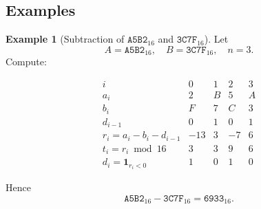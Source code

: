 \documentclass[11pt,a4paper]{article}
\theoremstyle{definition}
\newtheorem{example}{Example}[section]
\theoremstyle{remark}
\begin{document}
\subsection{Examples}
\begin{example}[Subtraction of $\texttt{A5B2}_{16}$ and $\texttt{3C7F}_{16}$]
	Let
	\[
	A = \texttt{A5B2}_{16},\quad B = \texttt{3C7F}_{16},\quad n=3.
	\]
	Compute:
\begin{center}
	\begin{minipage}{.475\textwidth}\centering
	\end{minipage}\hfill
	\begin{minipage}{.475\textwidth} 	\[
		\begin{array}{c|cccc}
			i & 0 & 1 & 2 & 3 \\ \hline
			a_i & 2 & B & 5 & A \\
			b_i & F & 7 & C & 3 \\
			d_{i-1} & 0 & 1 & 0 & 1 \\
			r_i = a_i - b_i - d_{i-1} & -13 & 3 & -7 & 6 \\
			t_i = r_i\bmod16 & 3 & 3 & 9 & 6 \\
			d_i = \mathbf{1}_{r_i<0} & 1 & 0 & 1 & 0
		\end{array}
		\]
	\end{minipage}
\end{center}
	Hence
	\[
	\texttt{A5B2}_{16} - \texttt{3C7F}_{16} = \texttt{6933}_{16}.
	\]
\end{example}
\newpage
\end{document}
